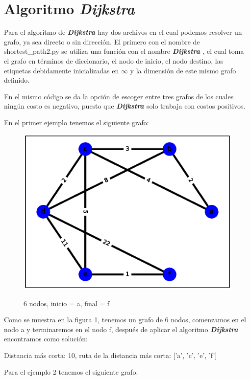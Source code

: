\documentclass{report}
\newcommand{\dij}{{\bfseries {\textit{Dijkstra }}}}
\begin{document}
\tableofcontents
\newpage
\section{Algoritmo \dij}
Para el algoritmo de \dij hay dos archivos en el cual podemos resolver un grafo, ya sea directo o sin dirección. El primero con el nombre de shortest\_path2.py se utiliza una función con el nombre \dij, el cual toma el grafo en términos de diccionario, el nodo de inicio, el nodo destino, las etiquetas debidamente inicializadas en $\infty$ y la dimensión de este mismo grafo definido.

En el mismo código se da la opción de escoger entre tres grafos de los cuales ningún costo es negativo, puesto que \dij solo trabaja con costos positivos.

En el primer ejemplo tenemos el siguiente grafo:
\begin{figure}[ht]
    \centering
    \includegraphics[scale = 0.4]{ejemplo1.eps}
    \label{figura1}
    \caption{6 nodos, inicio = a, final = f}
\end{figure}

Como se muestra en la figura 1, tenemos un grafo de 6 nodos, comenzamos en el nodo a y terminaremos en el nodo f, después de aplicar el algoritmo \dij encontramos como solución:
\begin{center}
    Distancia más corta:
    10,
    ruta de la distancia más corta:
    ['a', 'c', 'e', 'f']
\end{center}

Para el ejemplo 2 tenemos el siguiente grafo:
\end{document}
